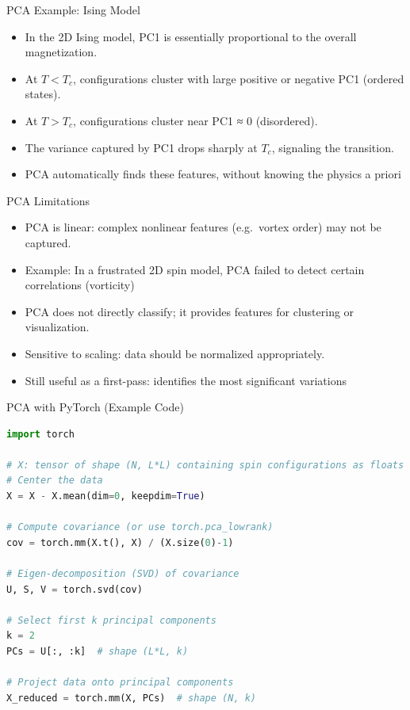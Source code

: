 \documentclass{beamer}
\begin{document}
\begin{frame}{PCA Example: Ising Model}
 \begin{itemize}
   \item In the 2D Ising model, PC1 is essentially proportional to the overall magnetization.
   \item At $T < T_c$, configurations cluster with large positive or negative PC1 (ordered states).
   \item At $T > T_c$, configurations cluster near PC1 ≈ 0 (disordered).
   \item The variance captured by PC1 drops sharply at $T_c$, signaling the transition.
   \item PCA automatically finds these features, without knowing the physics a priori 
 \end{itemize}
\end{frame}

\begin{frame}{PCA Limitations}
 \begin{itemize}
   \item PCA is linear: complex nonlinear features (e.g.\ vortex order) may not be captured.
   \item Example: In a frustrated 2D spin model, PCA failed to detect certain correlations (vorticity) 
   \item PCA does not directly classify; it provides features for clustering or visualization.
   \item Sensitive to scaling: data should be normalized appropriately.
   \item Still useful as a first-pass: identifies the most significant variations 
 \end{itemize}
\end{frame}

\begin{frame}[fragile]{PCA with PyTorch (Example Code)}
 \begin{lstlisting}[language=Python]
import torch

# X: tensor of shape (N, L*L) containing spin configurations as floats (e.g. +1/-1)
# Center the data
X = X - X.mean(dim=0, keepdim=True)

# Compute covariance (or use torch.pca_lowrank)
cov = torch.mm(X.t(), X) / (X.size(0)-1)

# Eigen-decomposition (SVD) of covariance
U, S, V = torch.svd(cov)

# Select first k principal components
k = 2
PCs = U[:, :k]  # shape (L*L, k)

# Project data onto principal components
X_reduced = torch.mm(X, PCs)  # shape (N, k)
 \end{lstlisting}
\end{frame}
\end{document}
